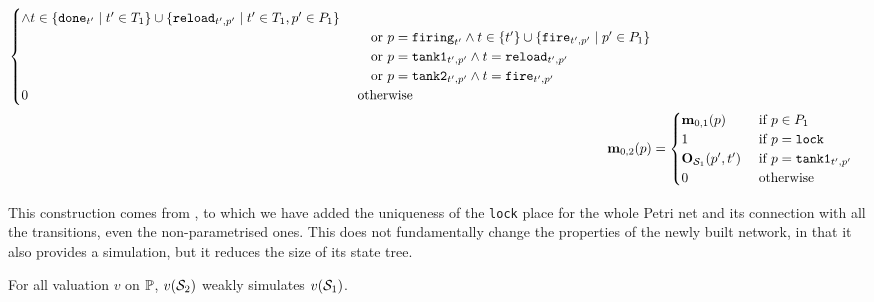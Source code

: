 \begin{align*}
\begin{cases}
          \wedge t \in \setComp{\mathtt{done}_{t'}}{t' \in \transitions_1} \cup \setComp{\mathtt{reload}_{t',p'}}{t' \in \transitions_1, p' \in \places_1} \\
        &\quad\text{ or } p = \mathtt{firing}_{t'}
          \wedge t \in \{t'\} \cup \setComp{\mathtt{fire}_{t',p'}}{p' \in \places_1} \\
        &\quad\text{ or } p = \mathtt{tank1}_{t',p'} \wedge t = \mathtt{reload}_{t',p'} \\
        &\quad\text{ or } p = \mathtt{tank2}_{t',p'} \wedge t = \mathtt{fire}_{t',p'} \\
      0 &\text{ otherwise }
    \end{cases}\\
  \mar_{0,2}(p) &= \begin{cases}
      \mar_{0,1}(p)             &\text{ if } p \in \places_1 \\
      1                         &\text{ if } p = \mathtt{lock} \\
      \outm[\namePPN[1]][p',t'] &\text{ if } p = \mathtt{tank1}_{t',p'} \\
      0                         &\text{ otherwise }
    \end{cases}
\end{align*}

This construction comes from \cite{David17}, to which we have added the uniqueness of the \texttt{lock} place for the whole Petri net and its connection with all the transitions, even the non-parametrised ones.
This does not fundamentally change the properties of the newly built network, in that it also provides a simulation, but it reduces the size of its state tree.

\begin{lemm}
  For all valuation $v$ on $\parameters$, $v(\namePPN[2])$ weakly simulates $v(\namePPN[1])$.
\end{lemm}

